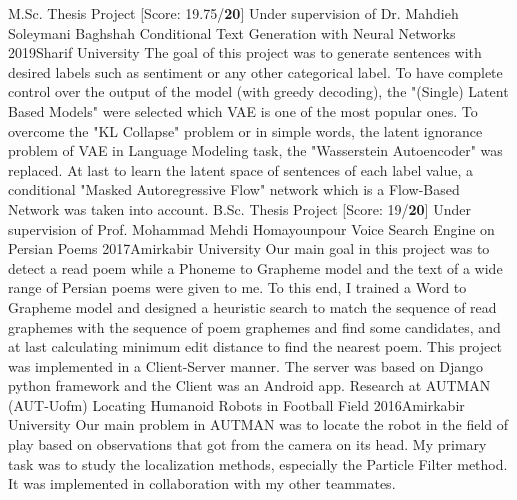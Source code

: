 
\begin{cventries}
	\cventry
	{
		M.Sc. Thesis Project [Score: 19.75/\textbf{20}]
		\newline
		Under supervision of Dr. Mahdieh Soleymani Baghshah
	}
	{Conditional Text Generation with Neural Networks}
	{2019}{Sharif University}
	{
        The goal of this project was to generate sentences with desired labels such as sentiment or any other categorical label. To have complete control over the output of the model (with greedy decoding), the "(Single) Latent Based Models" were selected which VAE is one of the most popular ones. To overcome the "KL Collapse" problem or in simple words, the latent ignorance problem of VAE in Language Modeling task, the "Wasserstein Autoencoder" was replaced. At last to learn the latent space of sentences of each label value, a conditional "Masked Autoregressive Flow" network which is a Flow-Based Network was taken into account.
	}
	\vspace{0.6cm}
	\cventry
	{
        B.Sc. Thesis Project [Score: 19/\textbf{20}]
        \newline
        Under supervision of Prof. Mohammad Mehdi Homayounpour
    }
	{Voice Search Engine on Persian Poems}
	{2017}{Amirkabir University}
	{
        Our main goal in this project was to detect a read poem while a Phoneme to Grapheme model and the text of a wide range of Persian poems were given to me. To this end, I trained a Word to Grapheme model and designed a heuristic search to match the sequence of read graphemes with the sequence of poem graphemes and find some candidates, and at last calculating minimum edit distance to find the nearest poem. This project was implemented in a Client-Server manner. The server was based on Django python framework and the Client was an Android app.
	}
	\vspace{0.6cm}
	\cventry
	{Research at AUTMAN (AUT-Uofm)}
	{Locating Humanoid Robots in Football Field}
	{2016}{Amirkabir University}
	{
        Our main problem in AUTMAN was to locate the robot in the field of play based on observations that got from the camera on its head. My primary task was to study the localization methods, especially the Particle Filter method. It was implemented in collaboration with my other teammates.
	}
\end{cventries}

